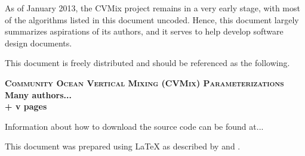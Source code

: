\documentclass[10pt]{book}
\begin{document}
As of January 2013, the CVMix project remains in a very early stage,
with most of the algorithms listed in this document uncoded.  Hence,
this document largely summarizes aspirations of its authors, and it
serves to help develop software design documents.


\vspace{2cm}

\noindent
This document is freely distributed and should be referenced as the
following. \vspace{.25cm}

\noindent
{\bf 
{\scshape{Community Ocean Vertical Mixing (CVMix) Parameterizations}}
\\
Many authors...
\\
\pageref{LastPage} + v pages\\
}
\vspace{.4cm}

\noindent Information about how to download the source code can be
found at...

\vspace{.4cm}

\noindent
This document was prepared using \LaTeX \hspace{.1cm} as described by
\cite{Latex} and \cite{LatexCompanion}.





\newpage 

\dominitoc
\tableofcontents
\listoffigures

\newpage 
{}












\newpage 


\gdef\rightmark{\scshape BIBLIOGRAPHY}

%


\printindex
\end{document}
